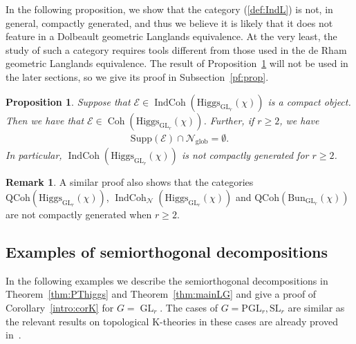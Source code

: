 \documentclass [11pt,oneside,a4paper,mathscr]{amsart}
\newtheorem{prop}[thm]{Proposition}
\theoremstyle{definition}
\newtheorem{remark}[thm]{Remark}
\renewcommand{\geq}{\geqslant}
\newcommand{\Coh}{\operatorname{Coh}}
\newcommand{\IndCoh}{\operatorname{IndCoh}}
\newcommand{\GL}{\operatorname{GL}}
\newcommand{\Hig}{\mathrm{Higgs}}
\newcommand{\Bun}{\mathrm{Bun}}
\begin{document}
In the following proposition, we show that the category (\ref{def:IndL}) is not, in general, compactly generated, and thus we believe it is likely that it does not feature in a Dolbeault geometric Langlands equivalence. At the very least, the study of such a category requires tools different from those used in the de Rham geometric Langlands equivalence.
The result of Proposition~\ref{prop:cgen} will not be used in the later sections, so we 
give its proof in Subsection~\ref{pf:prop}. 
\begin{prop}\label{prop:cgen}
Suppose that $\mathcal{E} \in \IndCoh(\Hig_{\mathrm{GL}_r}(\chi))$ 
is a compact object. Then we have that
$\mathcal{E} \in \Coh(\Hig_{\mathrm{GL}_r}(\chi))$. Further, 
if $r\geq 2$, we have 
\begin{align}\label{Esupport}
    \mathrm{Supp}(\mathcal{E}) \cap \mathcal{N}_{\mathrm{glob}}=\emptyset. 
\end{align}
In particular, 
$\IndCoh(\Hig_{\mathrm{GL}_r}(\chi))$ is not compactly generated for $r\geq 2$. 
\end{prop}

\begin{remark}\label{rmk:compact}
A similar proof also shows that the categories 
$\mathrm{QCoh}(\Hig_{\GL_r}(\chi))$, 
$\IndCoh_{\mathcal{N}}(\Hig_{\GL_r}(\chi))$
and $\mathrm{QCoh}(\Bun_{\GL_r}(\chi))$ are not compactly generated when 
$r\geq 2$. 
\end{remark}













\subsection{Examples of semiorthogonal decompositions}\label{subsec:SODLang}


In the following examples we describe the semiorthogonal decompositions in Theorem~\ref{thm:PThiggs}
and Theorem~\ref{thm:mainLG} and give a proof of Corollary~\ref{intro:corK} for $G=\GL_r$. The cases of 
$G=\mathrm{PGL}_r, \mathrm{SL}_r$ are similar as the relevant results on topological K-theories in 
these cases
are already proved in~\cite{PThiggs, PThiggs2}. 
\end{document}
